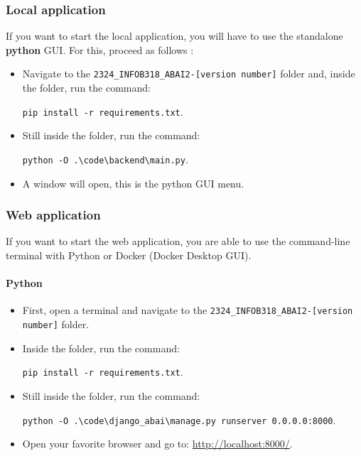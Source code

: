 \subsubsection{Local application}
\label{subsubsec:Local application}
If you want to start the local application, you will have to use the standalone \textbf{python} GUI. For this, proceed as follows : 

\begin{itemize}
  \item Navigate to the \texttt{2324\_INFOB318\_ABAI2-[\texttt{version number}]} folder and, inside the folder, run the command:\begin{codebox}
    \texttt{pip install -r requirements.txt}.
  \end{codebox}
  \item Still inside the folder, run the command: 
  \begin{codebox}
    \texttt{python -O .\textbackslash code\textbackslash backend\textbackslash main.py}.
  \end{codebox}
  \item A window will open, this is the python GUI menu. 
\end{itemize}
\clearpage
\subsubsection{Web application}
\label{subsubsec:Web application}
If you want to start the web application, you are able to use the command-line terminal with Python or Docker (Docker Desktop GUI). 

\paragraph{\fontsize{14}{17}\selectfont Python}
\begin{itemize}
  \item First, open a terminal and navigate to the \texttt{2324\_INFOB318\_ABAI2-[\texttt{version number}]} folder.
  \item Inside the folder, run the command: 
  \begin{codebox}
    \large\texttt{pip install -r requirements.txt}.
  \end{codebox}
  \item Still inside the folder, run the command:
  \begin{codebox}
    \large\texttt{python -O .\textbackslash code\textbackslash django\_abai\textbackslash manage.py runserver 0.0.0.0:8000}.
  \end{codebox}
  \item Open your favorite browser and go to: \url{http://localhost:8000/}.
\end{itemize}
